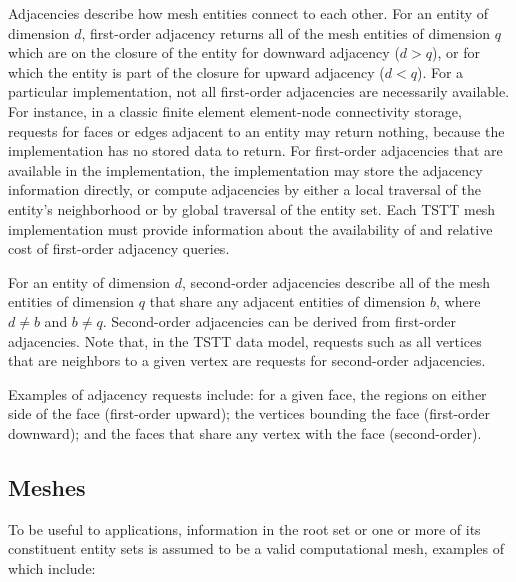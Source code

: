 Adjacencies describe how mesh entities connect to each other. For an
entity of dimension $d$, first-order adjacency returns all of the mesh
entities of dimension $q$ which are on the closure of the entity for
downward adjacency ($d>q$), or for which the entity is part of the
closure for upward adjacency ($d<q$). For a particular implementation,
not all first-order adjacencies are necessarily available.  For
instance, in a classic finite element element-node connectivity storage,
requests for faces or edges adjacent to an entity may return nothing,
because the implementation has no stored data to return.  For
first-order adjacencies that are available in the implementation, the
implementation may store the adjacency information directly, or compute
adjacencies by either a local traversal of the entity's neighborhood or
by global traversal of the entity set. Each TSTT mesh implementation
must provide information about the availability of and relative cost of
first-order adjacency queries.

For an entity of dimension $d$, second-order adjacencies describe
all of the mesh entities of dimension $q$ that share any adjacent
entities of dimension $b$, where $d\neq b$ and $b\neq q$. Second-order
adjacencies can be derived from first-order adjacencies. Note that,
in the TSTT data model, requests such as all vertices that are neighbors
to a given vertex are requests for second-order adjacencies.

Examples of adjacency requests include: for a given face, the regions
on either side of the face (first-order upward); the vertices bounding
the face (first-order downward); and the faces that share any vertex
with the face (second-order). 


\subsection{Meshes\label{sub:Meshes}}

To be useful to applications, information
in the root set or one or more of its constituent entity sets is assumed
to be a valid computational mesh, examples of which include: 

